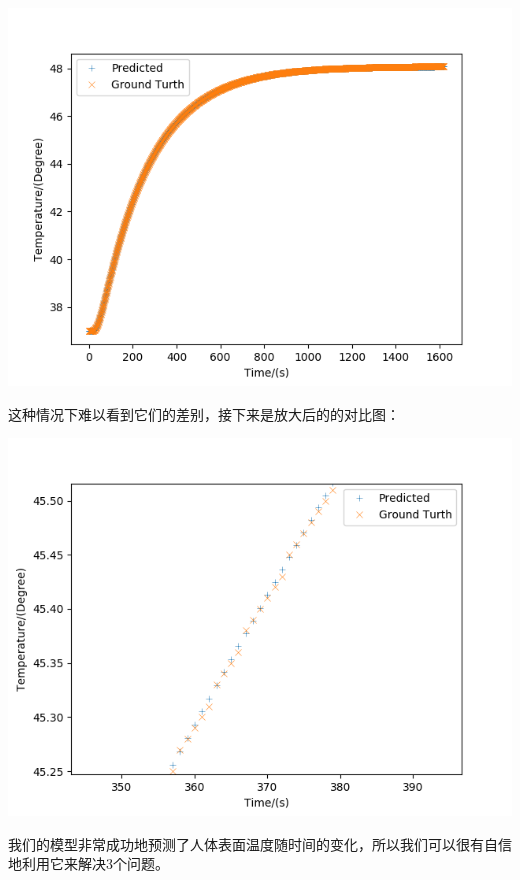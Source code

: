 \documentclass[bwprint]{cumcmthesis}
\begin{document}
    \begin{flushleft}
        \includegraphics[scale = 1]{Problem1.png}
    \end{flushleft}
    \indent 这种情况下难以看到它们的差别，接下来是放大后的的对比图：
    \begin{flushleft}
        \includegraphics[scale=1]{Problem11.png}
    \end{flushleft}
    \indent 我们的模型非常成功地预测了人体表面温度随时间的变化，所以我们可以很有自信地利用它来解决3个问题。
\end{document}
